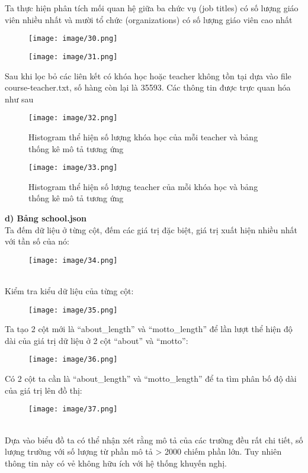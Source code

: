 Ta thực hiện phân tích mối quan hệ giữa ba chức vụ (job titles) có số lượng giáo viên nhiều nhất và mười tổ chức (organizations) có số lượng giáo viên cao nhất
\begin{figure}[h]
    \centering
    \texttt{[image: image/30.png]}
\end{figure}
\newpage
\begin{figure}
    \centering
    \texttt{[image: image/31.png]}
\end{figure}
Sau khi lọc bỏ các liên kết có khóa học hoặc teacher không tồn tại dựa vào file course-teacher.txt, số hàng còn lại là 35593. Các thông tin được trực quan hóa như sau
\begin{figure}[h]
    \centering
    \texttt{[image: image/32.png]}
    \caption{Histogram thể hiện số lượng khóa học của mỗi teacher và bảng thống kê mô tả tương ứng}
\end{figure}
\newpage
\begin{figure}
    \centering
    \texttt{[image: image/33.png]}
    \caption{Histogram thể hiện số lượng teacher của mỗi khóa học và bảng thống kê mô tả tương ứng}
\end{figure}
\textbf{d) Bảng school.json}\\
Ta đếm dữ liệu ở từng cột, đếm các giá trị đặc biệt, giá trị xuất hiện nhiều nhất với tần số của nó:
\begin{figure}[h]
    \centering
    \texttt{[image: image/34.png]}
\end{figure}\\
Kiểm tra kiểu dữ liệu của từng cột: 
\newpage
\begin{figure}
    \centering
    \texttt{[image: image/35.png]}
\end{figure}
Ta tạo 2 cột mới là “about\_length” và “motto\_length” để lần lượt thể hiện độ dài của giá trị dữ liệu ở 2 cột “about” và “motto”:
\begin{figure}[h]
    \centering
    \texttt{[image: image/36.png]}
\end{figure}
\newpage
Có 2 cột ta cần là “about\_length” và “motto\_length” để ta tìm phân bố độ dài của giá trị lên đồ thị:
\begin{figure}[h]
    \centering
    \texttt{[image: image/37.png]}
\end{figure}\\
Dựa vào biểu đồ ta có thể nhận xét rằng mô tả của các trường đều rất chi tiết, số lượng trường với số lượng từ phần mô tả > 2000  chiếm phần lớn. Tuy nhiên thông tin này có vẻ không hữu ích với hệ thống khuyến nghị.
